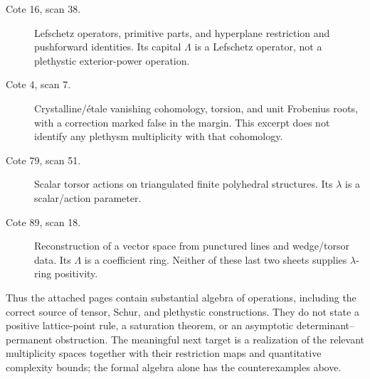 \begin{description}
\item[Cote 16, scan 38.] Lefschetz operators, primitive parts, and
hyperplane restriction and pushforward identities. Its capital $\Lambda$ is a
Lefschetz operator, not a plethystic exterior-power operation.
\item[Cote 4, scan 7.] Crystalline/\'etale vanishing cohomology, torsion,
and unit Frobenius roots, with a correction marked false in the margin.
This excerpt does not identify any plethysm multiplicity with that
cohomology.
\item[Cote 79, scan 51.] Scalar torsor actions on triangulated finite
polyhedral structures. Its $\lambda$ is a scalar/action parameter.
\item[Cote 89, scan 18.] Reconstruction of a vector space from punctured
lines and wedge/torsor data. Its $\Lambda$ is a coefficient ring. Neither
of these last two sheets supplies $\lambda$-ring positivity.
\end{description}

Thus the attached pages contain substantial algebra of operations, including
the correct source of tensor, Schur, and plethystic constructions. They do
not state a positive lattice-point rule, a saturation theorem, or an
asymptotic determinant--permanent obstruction. The meaningful next target
is a realization of the relevant multiplicity spaces together with their
restriction maps and quantitative complexity bounds; the formal algebra
alone has the counterexamples above.
